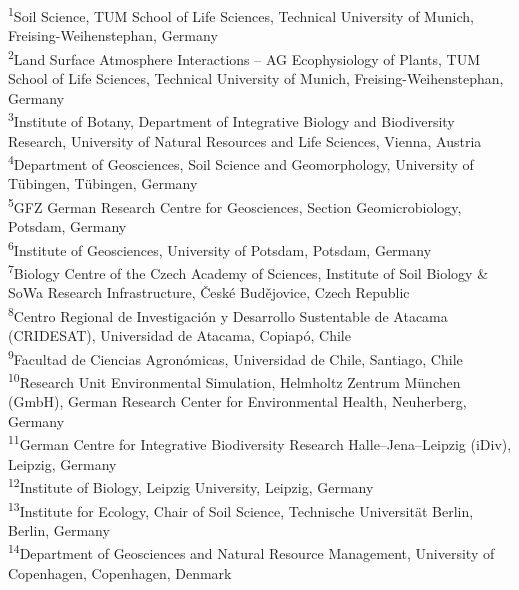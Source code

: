 \begin{scriptsize}
  \begin{justify}
    \textsuperscript{1}Soil Science, TUM School of Life Sciences, Technical University of Munich, Freising-Weihenstephan, Germany\\
    \textsuperscript{2}Land Surface Atmosphere Interactions -- AG Ecophysiology of Plants, TUM School of Life Sciences, Technical University of Munich, Freising-Weihenstephan, Germany\\
    \textsuperscript{3}Institute of Botany, Department of Integrative Biology and Biodiversity Research, University of Natural Resources and Life Sciences, Vienna, Austria\\
    \textsuperscript{4}Department of Geosciences, Soil Science and Geomorphology, University of T\"ubingen, T\"ubingen, Germany\\
    \textsuperscript{5}GFZ German Research Centre for Geosciences, Section Geomicrobiology, Potsdam, Germany\\
    \textsuperscript{6}Institute of Geosciences, University of Potsdam, Potsdam, Germany\\
    \textsuperscript{7}Biology Centre of the Czech Academy of Sciences, Institute of Soil Biology \& SoWa Research Infrastructure, \v{C}esk\'{e} Bud\v{e}jovice, Czech Republic\\
    \textsuperscript{8}Centro Regional de Investigaci\'{o}n y Desarrollo Sustentable de Atacama (CRIDESAT), Universidad de Atacama, Copiap\'{o}, Chile\\
    \textsuperscript{9}Facultad de Ciencias Agron\'{o}micas, Universidad de Chile, Santiago, Chile\\
    \textsuperscript{10}Research Unit Environmental Simulation, Helmholtz Zentrum M\"unchen (GmbH), German Research Center for Environmental Health, Neuherberg, Germany\\
    \textsuperscript{11}German Centre for Integrative Biodiversity Research Halle--Jena--Leipzig (iDiv), Leipzig, Germany\\
    \textsuperscript{12}Institute of Biology, Leipzig University, Leipzig, Germany\\
    \textsuperscript{13}Institute for Ecology, Chair of Soil Science, Technische Universit\"at Berlin, Berlin, Germany\\
    \textsuperscript{14}Department of Geosciences and Natural Resource Management, University of Copenhagen, Copenhagen, Denmark
  \end{justify}
\end{scriptsize}
    
